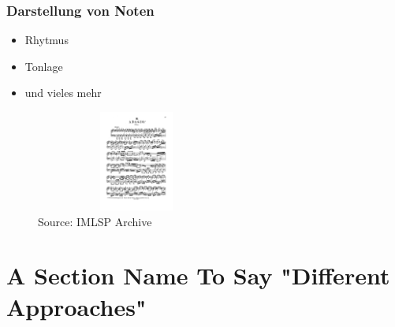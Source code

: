 \documentclass{beamer}
\begin{document}
	\begin{frame}
		\frametitle{Darstellung von Noten}
		\begin{itemize}
			\item Rhytmus
			\item Tonlage 
			\item und vieles mehr
			\end{itemize}
	
		
		\begin{figure}[h!]
			\includegraphics[width=250px,height=125px,keepaspectratio]{bach_adagio}
			\caption{Source: IMLSP Archive}
		\end{figure}


	\end{frame}

	
	\section{A Section Name To Say "Different Approaches"}
\end{document}
